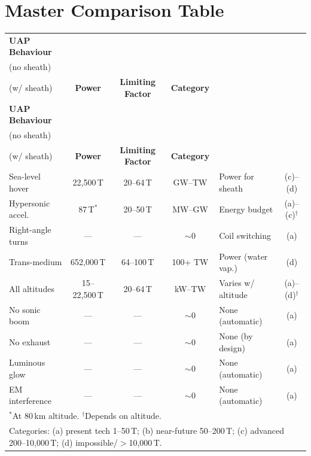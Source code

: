 \documentclass[12pt,a4paper]{article}
\begin{document}
\section{Master Comparison Table}\label{sec:master}

\begin{longtable}{p{2.8cm}cccp{3.5cm}c}
\toprule
\textbf{UAP Behaviour} &
\makecell{$B_{\min}$\\(no sheath)} &
\makecell{$B_{\min}$\\(w/ sheath)} &
\textbf{Power} &
\textbf{Limiting Factor} &
\textbf{Category} \\
\midrule
\endfirsthead
\toprule
\textbf{UAP Behaviour} &
\makecell{$B_{\min}$\\(no sheath)} &
\makecell{$B_{\min}$\\(w/ sheath)} &
\textbf{Power} &
\textbf{Limiting Factor} &
\textbf{Category} \\
\midrule
\endhead
Sea-level hover     & 22,500\,T & 20--64\,T & GW--TW  & Power for sheath  & (c)--(d) \\
Hypersonic accel.   & 87\,T$^*$  & 20--50\,T & MW--GW  & Energy budget     & (a)--(c)$^\dagger$ \\
Right-angle turns   & ---        & ---       & $\sim 0$ & Coil switching    & (a) \\
Trans-medium        & 652,000\,T & 64--100\,T & 100+ TW & Power (water vap.) & (d) \\
All altitudes       & 15--22,500\,T & 20--64\,T & kW--TW & Varies w/ altitude & (a)--(d)$^\dagger$ \\
No sonic boom       & ---        & ---       & $\sim 0$ & None (automatic)  & (a) \\
No exhaust          & ---        & ---       & $\sim 0$ & None (by design)  & (a) \\
Luminous glow       & ---        & ---       & $\sim 0$ & None (automatic)  & (a) \\
EM interference     & ---        & ---       & $\sim 0$ & None (automatic)  & (a) \\
\bottomrule
\multicolumn{6}{l}{\footnotesize $^*$At 80\,km altitude. $^\dagger$Depends on altitude.}\\
\multicolumn{6}{l}{\footnotesize Categories: (a) present tech 1--50\,T;
  (b) near-future 50--200\,T; (c) advanced 200--10,000\,T; (d) impossible/$>$10,000\,T.}
\end{longtable}
\end{document}
